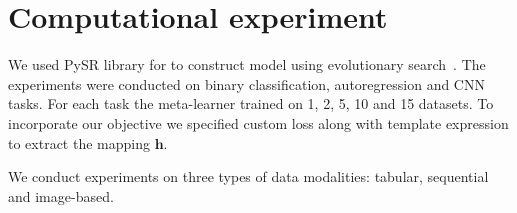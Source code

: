 \documentclass{article}
\begin{document}





\section{Computational experiment}
We used PySR library for to construct model using evolutionary search~\citep{Cranmer2023InterpretableML}. The experiments were conducted on binary classification, autoregression and CNN tasks. For each task the meta-learner trained on 1, 2, 5, 10 and 15 datasets. To incorporate our objective we specified custom loss along with template expression to extract the mapping \(\mathbf{h}\).

    We conduct experiments on three types of data modalities: tabular, sequential and image-based. 
\end{document}
